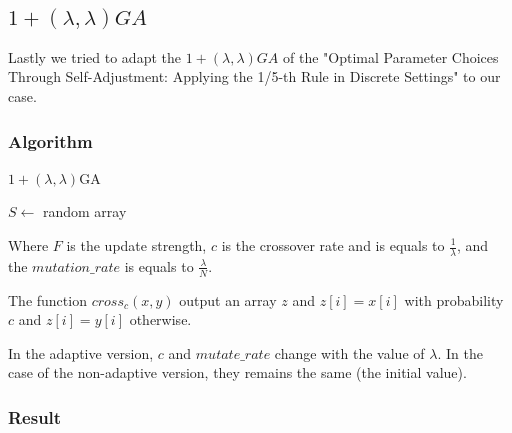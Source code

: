 \documentclass[12pt]{article}
\theoremstyle{definition}
\theoremstyle{plain}
\theoremstyle{remark}
\begin{document}
\subsection{$1 + (\lambda, \lambda)GA$}
Lastly we tried to adapt the $1 + (\lambda, \lambda)GA$ of the "Optimal Parameter Choices Through Self-Adjustment: Applying the 1/5-th Rule in Discrete Settings" to our case.

\subsubsection{Algorithm}
\begin{algorithm}[H]
	\caption{$1 + (\lambda, \lambda)$GA}
	$S \leftarrow$ random array\\
\end{algorithm}

Where $F$ is the update strength, $c$ is the crossover rate and is equals to $\frac{1}{\lambda}$, and the $mutation\_rate$ is equals to $\frac{\lambda}{N}$.

The function $cross_c(x, y)$ output an array $z$ and $z[i] = x[i]$ with probability $c$ and $z[i] = y[i]$ otherwise.

In the adaptive version, $c$ and $mutate\_rate$ change with the value of $\lambda$. In the case of the non-adaptive version, they remains the same (the initial value).

\subsubsection{Result}
\end{document}
